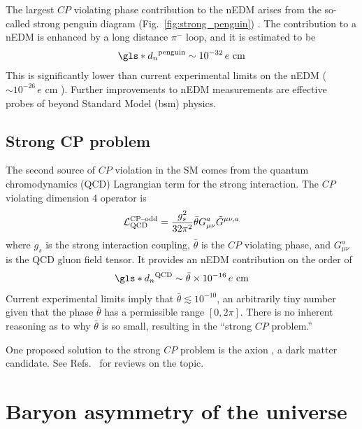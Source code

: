 The largest $CP$ violating phase contribution to the nEDM arises from the so-called strong penguin diagram (Fig.~\ref{fig:strong_penguin}) \cite{POS05}. The contribution to a nEDM is enhanced by a long distance $\pi^-$ loop, and it is estimated to be
%
\begin{gather}
    \gls*{d_n}^\text{penguin} \sim 10^{-32}\,e\text{ cm}
\end{gather}
%
This is significantly lower than current experimental limits on the nEDM ($\sim 10^{-26}\,e\text{ cm}$ \cite{ABE20}). Further improvements to nEDM measurements are effective probes of beyond Standard Model (\acrshort*{bsm}) physics.


\subsection{Strong CP problem}


The second source of $CP$ violation in the SM comes from the quantum chromodynamics (QCD) Lagrangian term for the strong interaction. The $CP$ violating dimension 4 operator is
%
\begin{gather}
    \mathcal{L}_\text{QCD}^\text{CP\textendash odd}=\frac{g^2_s}{32\pi^2}\bar{\theta}G^a_{\mu\nu}\tilde{G}^{\mu\nu, a}
\end{gather}
%
where $g_s$ is the strong interaction coupling, $\bar{\theta}$ is the $CP$ violating phase, and $G^a_{\mu\nu}$ is the QCD gluon field tensor. It provides an nEDM contribution on the order of \cite{cp_violation_wo_strangeness}
%
\begin{gather}
    \gls*{d_n}^\text{QCD}\sim \bar{\theta}\times 10^{-16}\,e\text{ cm}
\end{gather}
%
Current experimental limits imply that $\bar{\theta}\lesssim 10^{-10}$, an arbitrarily tiny number given that the phase $\bar{\theta}$ has a permissible range $[0, 2\pi]$. There is no inherent reasoning as to why $\bar{\theta}$ is so small, resulting in the ``strong $CP$ problem.''

One proposed solution to the strong $CP$ problem is the axion \cite{peccei_quinn_axion}, a dark matter candidate. See Refs.~\cite{BAER20151, kim_gianpaolo_2010} for reviews on the topic.


\section{Baryon asymmetry of the universe}

